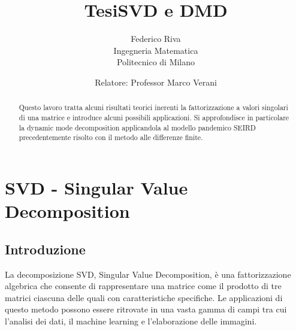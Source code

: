 \documentclass[11pt]{article}
\begin{document}
\title{Tesi}
\author{Federico Riva\\Ingegneria Matematica\\Politecnico di Milano}
\title{SVD e DMD}
\date{Relatore: Professor Marco Verani}
\maketitle
\begin{abstract} 
Questo lavoro tratta alcuni risultati teorici inerenti la fattorizzazione a valori singolari di una matrice e introduce alcuni possibili applicazioni. Si approfondisce in particolare la dynamic mode decomposition applicandola al modello pandemico SEIRD precedentemente risolto con il metodo alle differenze finite. 
\end{abstract}
\newpage
\tableofcontents
\newpage
\section{SVD - Singular Value Decomposition}
\subsection{Introduzione}
La decomposizione SVD, Singular Value Decomposition, è una fattorizzazione algebrica che consente di rappresentare una matrice come il prodotto di tre matrici ciascuna delle quali con caratteristiche specifiche. Le applicazioni di questo metodo possono essere ritrovate in una vasta gamma di campi tra cui l'analisi dei dati, il machine learning e l'elaborazione delle immagini.
\end{document}
